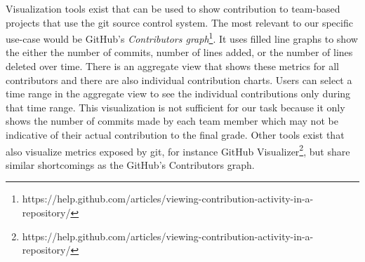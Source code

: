 \documentclass[../manifest.tex]{subfiles}
\begin{document}
Visualization tools exist that can be used to show contribution to team-based projects that use the git source control system. The most relevant to our specific use-case would be GitHub's \textit{Contributors graph}\footnote{https://help.github.com/articles/viewing-contribution-activity-in-a-repository/}. It uses filled line graphs to show the either the number of commits, number of lines added, or the number of lines deleted over time. There is an aggregate view that shows these metrics for all contributors and there are also individual contribution charts. Users can select a time range in the aggregate view to see the individual contributions only during that time range. This visualization is not sufficient for our task because it only shows the number of commits made by each team member which may not be indicative of their actual contribution to the final grade. Other tools exist that also visualize metrics exposed by git, for instance GitHub Visualizer\footnote{https://help.github.com/articles/viewing-contribution-activity-in-a-repository/}, but share similar shortcomings as the GitHub's Contributors graph.
\end{document}
